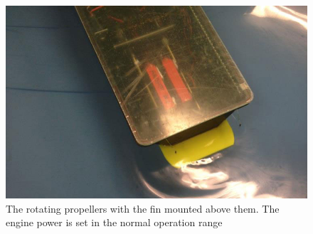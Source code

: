 \begin{figure}[fin]
	\centering
	\includegraphics[width=\textwidth]{Pictures/Fin.jpg}
	\caption{The rotating propellers with the fin mounted above them. The engine power is set in the normal operation range}
	\label{fig:vessel-block-overview}
\end{figure}